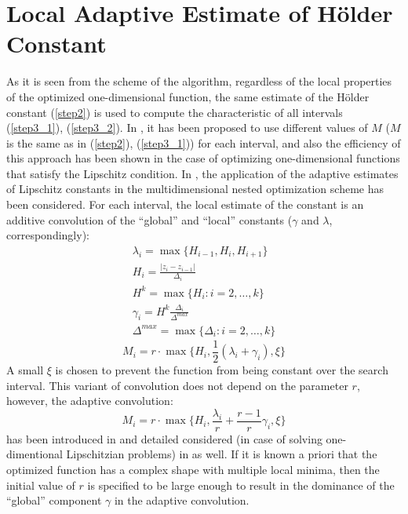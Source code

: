 \documentclass[procedia]{easychair}
\begin{document}
\section{Local Adaptive Estimate of Hölder Constant}
As it is seen from the scheme of the algorithm, regardless of the local properties
of the optimized one-dimensional function, the same estimate of the Hölder
constant (\ref{step2}) is used to compute the characteristic of all intervals (\ref{step3_1}), (\ref{step3_2}).
In \cite{sergLocalTuningFirst}, it has been proposed to use different values of \(M\) (\(M\) is the same as in (\ref{step2}), (\ref{step3_1})) for each interval,
and also the efficiency of this approach has been shown in the case of optimizing
one-dimensional functions that satisfy the Lipschitz condition. In \cite{nestedLocal},
the application of the adaptive estimates of Lipschitz constants in the multidimensional
nested optimization scheme has been considered. For each interval, the local estimate of the
constant is an additive convolution of the ``global'' and ``local'' constants
(\(\gamma\) and \(\lambda\), correspondingly):
\begin{displaymath}
  \begin{array}{lr}
    \lambda_i=\max\{H_{i-1},H_i,H_{i+1}\} \\
    H_i=\frac{|z_i-z_{i-1}|}{\Delta_i} \\
    H^k=\max\{H_i:i=2,\dots ,k\} \\
    \gamma_i=H^k\frac{\Delta_i}{\Delta^{max}} \\
    \Delta^{max}=\max\{\Delta_{i}:i=2,\dots ,k\}
  \end{array}
\end{displaymath}
\begin{equation}
\label{additiveConv}
M_i=r\cdot \max\{H_i, \frac{1}{2}(\lambda_i+\gamma_i),\xi\}
\end{equation}
A small \(\xi\) is chosen to prevent the function from being constant over the search interval.
This variant of convolution does not depend on the parameter \(r\), however, the adaptive convolution:
\begin{equation}
\label{additiveAdaptiveConv}
M_i=r\cdot \max\{H_i, \frac{\lambda_i}{r}+\frac{r-1}{r}\gamma_i,\xi\}
\end{equation}
has been introduced in \cite{gergel2010} and detailed considered (in case of solving one-dimentional Lipschitzian problems) in \cite{sergLocalTuning} as well.
If it is known a priori that the optimized function has a complex shape with multiple
local minima, then the initial value of \(r\) is specified to be large enough to
result in the dominance of the ``global'' component \(\gamma\) in the adaptive convolution.
\end{document}
